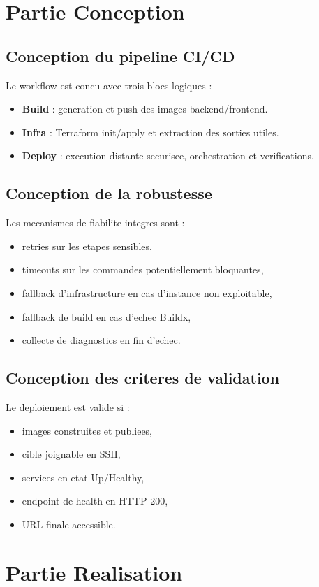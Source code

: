 \documentclass[12pt,a4paper]{report}
\begin{document}
\chapter{Partie Conception}
\section{Conception du pipeline CI/CD}
Le workflow est concu avec trois blocs logiques :
\begin{itemize}
  \item \textbf{Build} : generation et push des images backend/frontend.
  \item \textbf{Infra} : Terraform init/apply et extraction des sorties utiles.
  \item \textbf{Deploy} : execution distante securisee, orchestration et verifications.
\end{itemize}

\section{Conception de la robustesse}
Les mecanismes de fiabilite integres sont :
\begin{itemize}
  \item retries sur les etapes sensibles,
  \item timeouts sur les commandes potentiellement bloquantes,
  \item fallback d'infrastructure en cas d'instance non exploitable,
  \item fallback de build en cas d'echec Buildx,
  \item collecte de diagnostics en fin d'echec.
\end{itemize}

\section{Conception des criteres de validation}
Le deploiement est valide si :
\begin{itemize}
  \item images construites et publiees,
  \item cible joignable en SSH,
  \item services en etat Up/Healthy,
  \item endpoint de health en HTTP 200,
  \item URL finale accessible.
\end{itemize}

\chapter{Partie Realisation}
\end{document}
